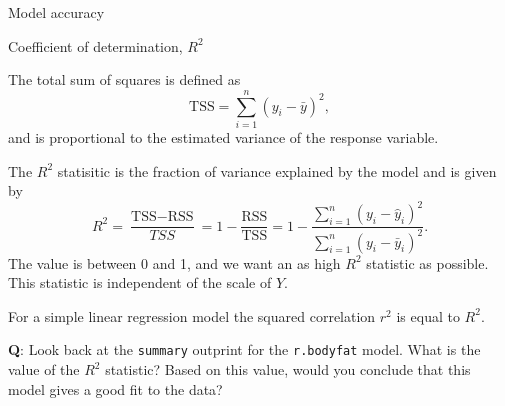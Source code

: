 \documentclass[10pt,ignorenonframetext,]{beamer}
\begin{document}
\begin{frame}

\begin{block}{Model accuracy}

\begin{block}{Coefficient of determination, \(R^2\)}

The total sum of squares is defined as
\[\text{TSS} = \sum_{i=1}^n (y_i - \bar{y})^2,\] and is proportional to
the estimated variance of the response variable.

The \(R^2\) statisitic is the fraction of variance explained by the
model and is given by
\[R^2 = \frac{\text{TSS}-\text{RSS}}{TSS}= 1-\frac{\text{RSS}}{\text{TSS}}=1-\frac{\sum_{i=1}^n(y_i-\hat{y}_i)^2}{\sum_{i=1}^n(y_i-\bar{y}_i)^2}.\]
The value is between 0 and 1, and we want an as high \(R^2\) statistic
as possible. This statistic is independent of the scale of \(Y\).

\end{block}

\end{block}

\end{frame}

\begin{frame}[fragile]

For a simple linear regression model the squared correlation \(r^2\) is
equal to \(R^2\).

\textbf{Q}: Look back at the \texttt{summary} outprint for the
\texttt{r.bodyfat} model. What is the value of the \(R^2\) statistic?
Based on this value, would you conclude that this model gives a good fit
to the data?

\end{frame}
\end{document}
